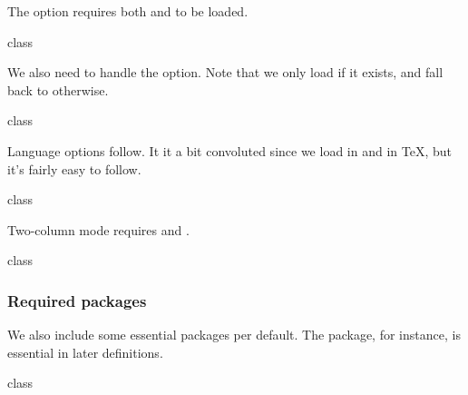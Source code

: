 \documentclass{skdoc}
\begin{document}
	The  option requires both  and
	 to be loaded.
\begin{MacroCode}{class}
\ifskrapport@color
	\RequirePackage{etoolbox}
	\RequirePackage{xcolor}
\fi
\end{MacroCode}

	We also need to handle the  option. Note that we only
	load  if it exists, and fall back to 
	otherwise.
\begin{MacroCode}{class}	
\end{MacroCode}

	Language options follow. It it a bit convoluted since we load
	 in  and  in \TeX,
	but it's fairly easy to follow.
\begin{MacroCode}{class}
\ifxetex
	\RequirePackage{xkeyval}
	\RequirePackage{polyglossia}
	\ifskrapport@eng
		\setmainlanguage[variant=british]{english}
	\else
		\setmainlanguage{swedish}
	\fi
\else
	\ifskrapport@eng
	\else
	\fi
\fi
\end{MacroCode}

	Two-column mode requires  and .
\begin{MacroCode}{class}
\ifskrapport@twocolumn
	\RequirePackage{etoolbox}
	\RequirePackage{multicol}
\fi
\end{MacroCode}

	\subsubsection{Required packages}
	We also include some essential packages per default. The
	 package, for instance, is essential in later
	definitions.
\begin{MacroCode}{class}
\RequirePackage{calc}
\end{MacroCode}
\end{document}
